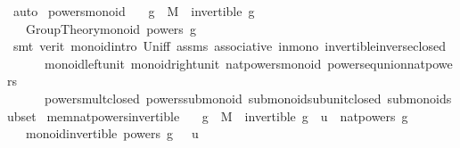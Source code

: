 \begin{isabellebody}
\ auto\isanewline
{}\isamarkupfalse%
%
\endisatagproof
{\isafoldproof}%
%
\isadelimproof
\isanewline
%
\endisadelimproof
\isanewline
{}\isamarkupfalse%
\ powers{\isacharunderscore}{\kern0pt}monoid{\isacharcolon}{\kern0pt}\isanewline
\ \ \ {\isachardoublequoteopen}g\ {\isasymin}\ M{\isachardoublequoteclose}\ \ {\isachardoublequoteopen}invertible\ g{\isachardoublequoteclose}\isanewline
\ \ \ {\isachardoublequoteopen}Group{\isacharunderscore}{\kern0pt}Theory{\isachardot}{\kern0pt}monoid\ {\isacharparenleft}{\kern0pt}powers\ g{\isacharparenright}{\kern0pt}\ {\isacharparenleft}{\kern0pt}{\isasymcdot}{\isacharparenright}{\kern0pt}\ {\isasymone}{\isachardoublequoteclose}\isanewline
%
\isadelimproof
\ \ %
\endisadelimproof
%
\isatagproof
{}\isamarkupfalse%
\ {\isacharparenleft}{\kern0pt}smt\ {\isacharparenleft}{\kern0pt}verit{\isacharparenright}{\kern0pt}\ monoid{\isachardot}{\kern0pt}intro\ Un{\isacharunderscore}{\kern0pt}iff\ assms\ associative\ in{\isacharunderscore}{\kern0pt}mono\ invertible{\isacharunderscore}{\kern0pt}inverse{\isacharunderscore}{\kern0pt}closed\ \isanewline
\ \ \ \ \ \ monoid{\isachardot}{\kern0pt}left{\isacharunderscore}{\kern0pt}unit\ monoid{\isachardot}{\kern0pt}right{\isacharunderscore}{\kern0pt}unit\ nat{\isacharunderscore}{\kern0pt}powers{\isacharunderscore}{\kern0pt}monoid\ powers{\isacharunderscore}{\kern0pt}eq{\isacharunderscore}{\kern0pt}union{\isacharunderscore}{\kern0pt}nat{\isacharunderscore}{\kern0pt}powers\ \isanewline
\ \ \ \ \ \ powers{\isacharunderscore}{\kern0pt}mult{\isacharunderscore}{\kern0pt}closed\ powers{\isacharunderscore}{\kern0pt}submonoid\ submonoid{\isachardot}{\kern0pt}sub{\isacharunderscore}{\kern0pt}unit{\isacharunderscore}{\kern0pt}closed\ submonoid{\isachardot}{\kern0pt}subset{\isacharparenright}{\kern0pt}%
\endisatagproof
{\isafoldproof}%
%
\isadelimproof
\isanewline
%
\endisadelimproof
\isanewline
{}\isamarkupfalse%
\ mem{\isacharunderscore}{\kern0pt}nat{\isacharunderscore}{\kern0pt}powers{\isacharunderscore}{\kern0pt}invertible{\isacharcolon}{\kern0pt}\isanewline
\ \ \ {\isachardoublequoteopen}g\ {\isasymin}\ M{\isachardoublequoteclose}\ \ {\isachardoublequoteopen}invertible\ g{\isachardoublequoteclose}\ \ {\isachardoublequoteopen}u\ {\isasymin}\ nat{\isacharunderscore}{\kern0pt}powers\ g{\isachardoublequoteclose}\isanewline
\ \ \ {\isachardoublequoteopen}monoid{\isachardot}{\kern0pt}invertible\ {\isacharparenleft}{\kern0pt}powers\ g{\isacharparenright}{\kern0pt}\ {\isacharparenleft}{\kern0pt}{\isasymcdot}{\isacharparenright}{\kern0pt}\ {\isasymone}\ u{\isachardoublequoteclose}\isanewline

\end{isabellebody}
